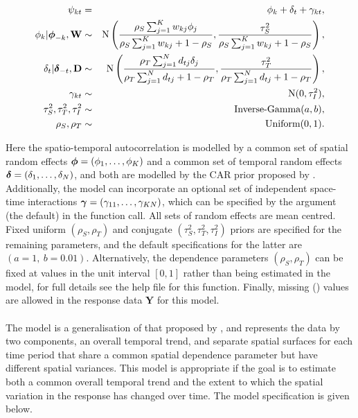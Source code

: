 \documentclass[article, nojss]{jss}
\newcommand{\bd}[1]{\ensuremath{\mbox{\boldmath $#1$}}}
\begin{document}
\begin{eqnarray}
\psi_{kt}&=&\phi_k +  \delta_t   + \gamma_{kt},\label{caranova}\\
\phi_k|\bd{\phi}_{-k},\mathbf{W}&\sim&\mbox{N}\left(\frac{\rho_{S}\sum_{j=1}^Kw_{kj}\phi_j}{\rho_{S}\sum_{j=1}^Kw_{kj} + 1-\rho_{S}}, \frac{\tau^2_{S}}{\rho_{S}\sum_{j=1}^Kw_{kj} + 1-\rho_{S}}\right),\nonumber\\
\delta_t|\bd{\delta}_{-t},\mathbf{D}&\sim&\mbox{N}\left(\frac{\rho_{T}\sum_{j=1}^N d_{tj}\delta_j}{\rho_{T}\sum_{j=1}^N d_{tj} + 1-\rho_{T}}, \frac{\tau^2_{T}}{\rho_{T}\sum_{j=1}^N d_{tj}+1-\rho_{T}}\right),\nonumber\\
\gamma_{kt}&\sim&\mbox{N}(0, \tau^2_{I} ),\nonumber\\
\tau^2_{S}, \tau^2_{T}, \tau^2_{I}&\sim&\mbox{Inverse-Gamma}(a,b),\nonumber\\
\rho_{S},\rho_{T}&\sim&\mbox{Uniform}(0,1).\nonumber
\end{eqnarray}


Here the spatio-temporal autocorrelation is modelled by a common set of spatial random effects $\bd{\phi}=(\phi_1,\ldots,\phi_K)$ and a common set of temporal random effects  $\bd{\delta}=(\delta_1,\ldots,\delta_N)$, and both are modelled by the CAR prior proposed by \cite{leroux2000}. Additionally, the model can incorporate an optional set of independent space-time interactions $\bd{\gamma}=(\gamma_{11},\ldots,\gamma_{KN})$, which can be specified by the argument  (the default) in the function call. All sets of random effects are mean centred. Fixed uniform $(\rho_{S},\rho_{T})$  and conjugate $(\tau^2_{S}, \tau^2_{T}, \tau^2_{I})$ priors are specified for the remaining parameters, and the default specifications for the latter are $(a=1,~ b=0.01)$. Alternatively, the  dependence parameters $(\rho_{S}, \rho_{T})$ can be fixed at values in the unit interval $[0,1]$ rather than being estimated in the model, for full details see the help file for this function. Finally, missing () values are allowed in the response data $\mathbf{Y}$ for this model.\\


\\
The model is a generalisation of that proposed by \cite{napier2016}, and represents the data by two components,  an overall temporal trend, and separate spatial surfaces for each time period that share a common spatial dependence parameter but have different spatial variances. This model is appropriate if the goal is to estimate both a common overall temporal trend and the extent to which the spatial variation in the response has changed over time. The model specification is given below.
\end{document}
